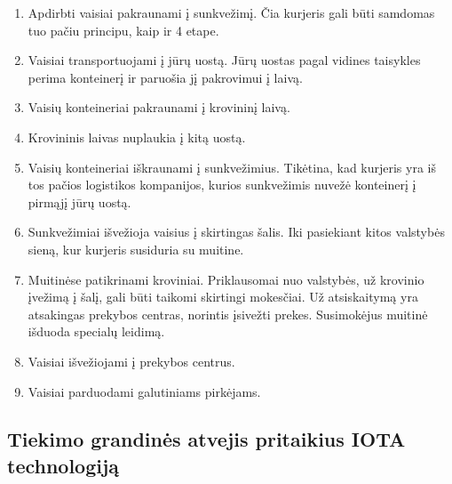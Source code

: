 \begin{enumerate}
    \item Apdirbti vaisiai pakraunami į sunkvežimį. Čia kurjeris gali būti samdomas tuo pačiu principu, kaip ir 4 etape.
    \item Vaisiai transportuojami į jūrų uostą. Jūrų uostas pagal vidines taisykles perima konteinerį ir paruošia jį pakrovimui į laivą.
    \item Vaisių konteineriai pakraunami į krovininį laivą.
    \item Krovininis laivas nuplaukia į kitą uostą.
    \item Vaisių konteineriai iškraunami į sunkvežimius. Tikėtina, kad kurjeris yra iš tos pačios logistikos kompanijos, kurios sunkvežimis nuvežė konteinerį į pirmąjį jūrų uostą.
    \item Sunkvežimiai išvežioja vaisius į skirtingas šalis. Iki pasiekiant kitos valstybės sieną, kur kurjeris susiduria su muitine.
    \item Muitinėse patikrinami kroviniai. Priklausomai nuo valstybės, už krovinio įvežimą į šalį, gali būti taikomi skirtingi mokesčiai. Už atsiskaitymą yra atsakingas prekybos centras, norintis įsivežti prekes. Susimokėjus muitinė išduoda specialų leidimą.
    \item Vaisiai išvežiojami į prekybos centrus.
    \item Vaisiai parduodami galutiniams pirkėjams.
\end{enumerate}




\subsection{Tiekimo grandinės atvejis pritaikius IOTA technologiją}
